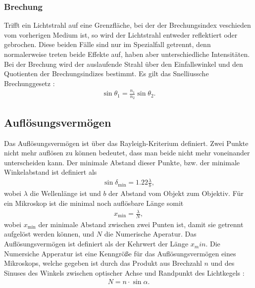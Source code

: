 \documentclass[12pt,a4paper,titlepage,headinclude]{scrartcl}
\numberwithin{equation}{subsection}
\begin{document}
\subsubsection{Brechung}
Trifft ein Lichtstrahl auf eine Grenzfläche, bei der der Brechungsindex veschieden vom vorherigen Medium ist, so wird der Lichtstrahl entweder reflektiert oder gebrochen.
Diese beiden Fälle sind nur im Spezialfall getrennt, denn normalerweise treten beide Effekte auf, haben aber unterschiedliche Intensitäten.
Bei der Brechung wird der auslaufende Strahl über den Einfallswinkel und den Quotienten der Brechungsindizes bestimmt.
Es gilt das Snelliussche Brechunggesetz \cite[101]{hecht}:
\begin{align}
	\sin{\theta_1}=\frac{n_1}{n_2}\sin{\theta_2}.
\label{eq:snell}
\end{align}


\subsection{Auflösungsvermögen}
Das Auflösungsvermögen ist über das Rayleigh-Kriterium \cite[366]{demtroeder2} definiert.
Zwei Punkte nicht mehr auflösen zu können bedeutet, dass man beide nicht mehr voneinander unterscheiden kann.
Der minimale Abstand dieser Punkte, bzw. der minimale Winkelabstand ist definiert als
\begin{align}
	\sin{\delta}_\text{min}=1.22\frac{\lambda}{b},\label{eq:rayleight}
\end{align}
wobei $\lambda$ die Wellenlänge ist und $b$ der Abstand vom Objekt zum Objektiv.
Für ein Mikroskop ist die minimal noch auflösbare Länge somit
\begin{align}
	x_\text{min}=\frac{\lambda}{N},\label{eq:aufloes}
\end{align}
wobei $x_\text{min}$ der minimale Abstand zwischen zwei Punten ist, damit sie getrennt aufgelöst werden können, und $N$ die Numerische Aperatur.
Das Auflösungsvermögen ist definiert als der Kehrwert der Länge $x_min$.
Die Numersiche Apperatur ist eine Kenngröße für das Auflösungsvermögen eines Mikroskops, welche gegeben ist durch das Produkt aus Brechzahl $n$ und des Sinuses des Winkels zwischen optischer Achse und Randpunkt des Lichtkegels \cite[369]{demtroeder2}:
\begin{align}
	N=n\cdot\sin{\alpha}.\label{eq:numapp}
\end{align}
\end{document}
